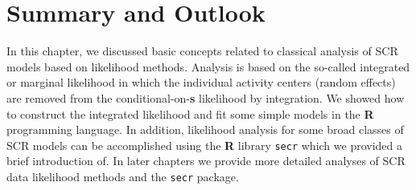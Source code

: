 \section{Summary and Outlook}

In this chapter, we discussed basic concepts
related to classical analysis of SCR models based
on likelihood methods. Analysis is
based on the so-called integrated or marginal likelihood in which the individual
activity centers (random effects) are removed from the
conditional-on-{\bf s} likelihood by integration. We showed how to construct
the integrated likelihood and fit some simple models in the {\bf R}
programming language.  In addition, likelihood analysis for some broad
classes of SCR models can be accomplished using the
{\bf R}
library \mbox{\tt secr} which we provided a brief introduction of. In
later 
chapters we provide more detailed analyses of SCR data likelihood
methods and the
\mbox{\tt secr}
package.

\begin{comment}
To compute the marginal (integrated) likelihood we have to precisely describe the
state-space of the underlying point process. In practice, this leads
to a ``buffer'' around the trap array. We note that this is not really a
``buffer strip'' in the sense of \citet{wilson_anderson:1985a},  
but it is somewhat more general here. In particular,
it establishes the support of the integrand and, 
in SCR models, it is an element of the model that
provides an explicit
linkage between population size $N$ and density $D$.
As a practical 
matter, it will typically be the case that, while estimates of $N$
increase with the area of the state-space (as they should!), estimates of density
stabilize. This is not a feature of the classical methods based on
using model $M_0$ or model $M_h$ and buffering the trap array.
\end{comment}

